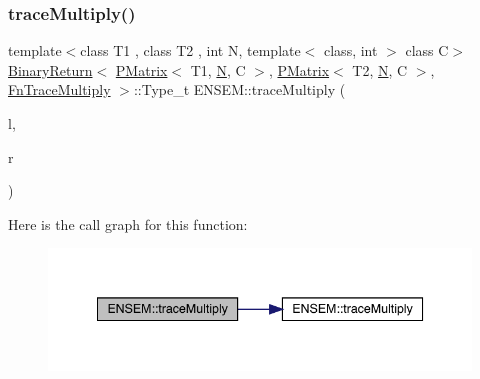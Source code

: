 \subsubsection{\texorpdfstring{traceMultiply()}{traceMultiply()}\hspace{0.1cm}{\footnotesize\ttfamily [1/3]}}
{\footnotesize\ttfamily template$<$class T1 , class T2 , int N, template$<$ class, int $>$ class C$>$ \\
\mbox{\hyperlink{structENSEM_1_1BinaryReturn}{Binary\+Return}}$<$ \mbox{\hyperlink{classENSEM_1_1PMatrix}{P\+Matrix}}$<$ T1, \mbox{\hyperlink{operator__name__util_8cc_a7722c8ecbb62d99aee7ce68b1752f337}{N}}, C $>$, \mbox{\hyperlink{classENSEM_1_1PMatrix}{P\+Matrix}}$<$ T2, \mbox{\hyperlink{operator__name__util_8cc_a7722c8ecbb62d99aee7ce68b1752f337}{N}}, C $>$, \mbox{\hyperlink{structENSEM_1_1FnTraceMultiply}{Fn\+Trace\+Multiply}} $>$\+::Type\+\_\+t E\+N\+S\+E\+M\+::trace\+Multiply (\begin{DoxyParamCaption}\item[{const \mbox{\hyperlink{classENSEM_1_1PMatrix}{P\+Matrix}}$<$ T1, \mbox{\hyperlink{operator__name__util_8cc_a7722c8ecbb62d99aee7ce68b1752f337}{N}}, C $>$ \&}]{l,  }\item[{const \mbox{\hyperlink{classENSEM_1_1PMatrix}{P\+Matrix}}$<$ T2, \mbox{\hyperlink{operator__name__util_8cc_a7722c8ecbb62d99aee7ce68b1752f337}{N}}, C $>$ \&}]{r }\end{DoxyParamCaption})\hspace{0.3cm}{\ttfamily [inline]}}

Here is the call graph for this function\+:\nopagebreak
\begin{figure}[H]
\begin{center}
\leavevmode
\includegraphics[width=342pt]{df/d0a/group__primmatrix_ga91e09af0f8d2d70627950b973f6b41ec_cgraph}
\end{center}
\end{figure}
\mbox{\label{group__primmatrix_gac4a39563bd9c9b587bd894f97f9e3fc4}} 
